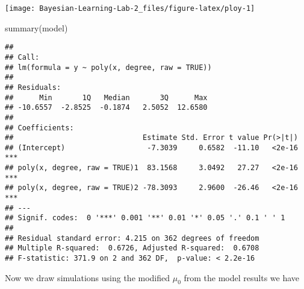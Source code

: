 \documentclass[
]{article}
\newenvironment{Shaded}{\begin{snugshade}}{\end{snugshade}}
\newcommand{\FunctionTok}[1]{\textcolor[rgb]{0.00,0.00,0.00}{#1}}
\newcommand{\NormalTok}[1]{#1}
\begin{document}
\begin{center}\texttt{[image: Bayesian-Learning-Lab-2\_files/figure-latex/ploy-1]} \end{center}

\begin{Shaded}
\begin{Highlighting}[]
\FunctionTok{summary}\NormalTok{(model)}
\end{Highlighting}
\end{Shaded}

\begin{verbatim}
## 
## Call:
## lm(formula = y ~ poly(x, degree, raw = TRUE))
## 
## Residuals:
##      Min       1Q   Median       3Q      Max 
## -10.6557  -2.8525  -0.1874   2.5052  12.6580 
## 
## Coefficients:
##                              Estimate Std. Error t value Pr(>|t|)    
## (Intercept)                   -7.3039     0.6582  -11.10   <2e-16 ***
## poly(x, degree, raw = TRUE)1  83.1568     3.0492   27.27   <2e-16 ***
## poly(x, degree, raw = TRUE)2 -78.3093     2.9600  -26.46   <2e-16 ***
## ---
## Signif. codes:  0 '***' 0.001 '**' 0.01 '*' 0.05 '.' 0.1 ' ' 1
## 
## Residual standard error: 4.215 on 362 degrees of freedom
## Multiple R-squared:  0.6726, Adjusted R-squared:  0.6708 
## F-statistic: 371.9 on 2 and 362 DF,  p-value: < 2.2e-16
\end{verbatim}

Now we draw simulations using the modified \(\mu_0\) from the model
results we have
\end{document}
